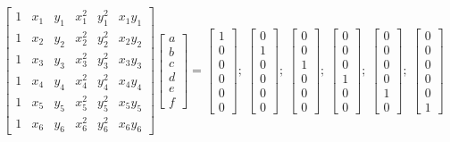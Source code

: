 \documentclass[10pt]{article}
\newcommand{\beq}{\begin{equation}}
\newcommand{\eeq}{\end{equation}}
\begin{document}
\beq
\begin{bmatrix} 1 & x_1 & y_1 & x_1^2 & y_1^2 & x_1y_1\\1 & x_2 & y_2 & x_2^2 & y_2^2 & x_2y_2\\1 & x_3 & y_3 & x_3^2 & y_3^2 & x_3y_3\\1 & x_4 & y_4 & x_4^2 & y_4^2 & x_4y_4\\1 & x_5 & y_5 & x_5^2 & y_5^2 & x_5y_5\\1 & x_6 & y_6 & x_6^2 & y_6^2 & x_6y_6\end{bmatrix}
\begin{bmatrix}a\\ b\\ c\\d\\e\\f\end{bmatrix}=\begin{bmatrix}1\\ 0\\ 0\\0\\0\\0\end{bmatrix};\ \begin{bmatrix}0\\ 1\\ 0\\0\\0\\0\end{bmatrix};\ \begin{bmatrix}0\\ 0\\ 1\\0\\0\\0\end{bmatrix};\ \begin{bmatrix}0\\ 0\\ 0\\1\\0\\0\end{bmatrix};\ \begin{bmatrix}0\\ 0\\ 0\\0\\1\\0\end{bmatrix};\ \begin{bmatrix}0\\ 0\\ 0\\0\\0\\1\end{bmatrix}
\eeq
\end{document}
